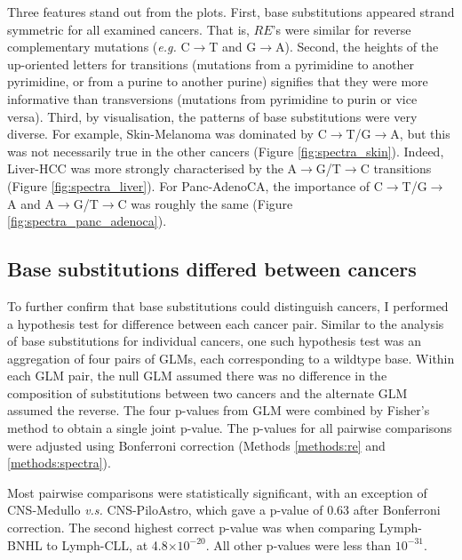 

Three features stand out from the plots. First, base substitutions appeared strand symmetric for all examined cancers. That is, $RE$'s were similar for reverse complementary mutations (\textit{e.g.} C$\rightarrow$T and G$\rightarrow$A). Second, the heights of the up-oriented letters for \glspl{transition} (mutations from a pyrimidine to another pyrimidine, or from a purine to another purine) signifies that they were more informative than \glspl{transversion} (mutations from pyrimidine to purin or vice versa). Third, by visualisation, the patterns of base substitutions were very diverse. For example, Skin-Melanoma was dominated by C$\rightarrow$T/G$\rightarrow$A, but this was not necessarily true in the other cancers (Figure \ref{fig:spectra_skin}). Indeed, Liver-HCC was more strongly characterised by the A$\rightarrow$G/T$\rightarrow$C transitions (Figure \ref{fig:spectra_liver}). For Panc-AdenoCA, the importance of C$\rightarrow$T/G$\rightarrow$A and A$\rightarrow$G/T$\rightarrow$C was roughly the same (Figure \ref{fig:spectra_panc_adenoca}).



\subsection{Base substitutions differed between cancers}\label{sce:paired_spectra}
To further confirm that base substitutions could distinguish cancers, I performed a hypothesis test for difference between each cancer pair. Similar to the analysis of base substitutions for individual cancers, one such hypothesis test was an aggregation of four pairs of GLMs, each corresponding to a wildtype base. Within each GLM pair, the null GLM assumed there was no difference in the composition of substitutions between two cancers and the alternate GLM assumed the reverse. The four p-values from GLM were combined by Fisher's method to obtain a single joint p-value. The p-values for all pairwise comparisons were adjusted using Bonferroni correction (Methods \ref{methods:re} and \ref{methods:spectra}).

Most pairwise comparisons were statistically significant, with an exception of CNS-Medullo \textit{v.s.} CNS-PiloAstro, which gave a p-value of 0.63 after Bonferroni correction. The second highest correct p-value was when comparing Lymph-BNHL to Lymph-CLL, at 4.8$\times10^{-20}$. All other p-values were less than $10^{-31}$. 


